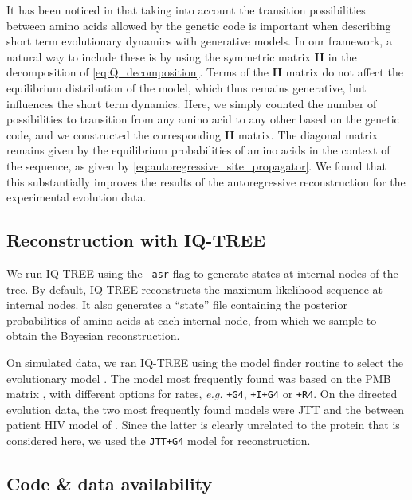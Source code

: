 It has been noticed in \cite{bisardi_modelingsequencespaceexploration_2021} that taking into account the transition possibilities between amino acids allowed by the genetic code is important when describing short term evolutionary dynamics with generative models. 
In our framework, a natural way to include these is by using the symmetric matrix $\mathbf{H}$ in the decomposition of \eqref{eq:Q_decomposition}. 
Terms of the $\mathbf{H}$ matrix do not affect the equilibrium distribution of the model, which thus remains generative, but influences the short term dynamics. 
Here, we simply counted the number of possibilities to transition from any amino acid to any other based on the genetic code, and we constructed the corresponding $\mathbf{H}$ matrix. 
The diagonal matrix remains given by the equilibrium probabilities of amino acids in the context of the sequence, as given by \eqref{eq:autoregressive_site_propagator}.
We found that this substantially improves the results of the autoregressive reconstruction for the experimental evolution data.

\subsection{Reconstruction with IQ-TREE}


We run IQ-TREE using the \texttt{-asr} flag to generate states at internal nodes of the tree. 
By default, IQ-TREE reconstructs the maximum likelihood sequence at internal nodes. 
It also generates a ``state'' file containing the posterior probabilities of amino acids at each internal node, from which we sample to obtain the Bayesian reconstruction. 

On simulated data, we ran IQ-TREE using the model finder routine to select the evolutionary model \cite{kalyaanamoorthy_modelfinderfastmodel_2017}. 
The model most frequently found was based on the PMB matrix \cite{veerassamy_transitionprobabilitymodel_2003}, with different options for rates, \emph{e.g.} \texttt{+G4}, \texttt{+I+G4} or \texttt{+R4}. 
On the directed evolution data, the two most frequently found models  were JTT \cite{jones_rapidgenerationmutation_1992} and the between patient HIV model of \cite{nickle_hivspecificprobabilisticmodels_2007}. 
Since the latter is clearly unrelated to the protein that is considered here, we used the \texttt{JTT+G4} model for reconstruction. 

\subsection{Code \& data availability}

